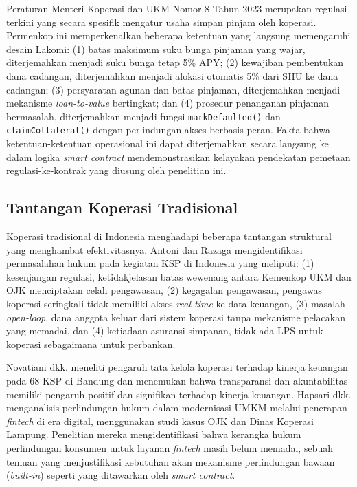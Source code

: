 Peraturan Menteri Koperasi dan UKM Nomor 8 Tahun 2023 \cite{permenkop82023} merupakan regulasi terkini yang secara spesifik mengatur usaha simpan pinjam oleh koperasi. Permenkop ini memperkenalkan beberapa ketentuan yang langsung memengaruhi desain Lakomi: (1) batas maksimum suku bunga pinjaman yang wajar, diterjemahkan menjadi suku bunga tetap 5\% APY; (2) kewajiban pembentukan dana cadangan, diterjemahkan menjadi alokasi otomatis 5\% dari SHU ke dana cadangan; (3) persyaratan agunan dan batas pinjaman, diterjemahkan menjadi mekanisme \textit{loan-to-value} bertingkat; dan (4) prosedur penanganan pinjaman bermasalah, diterjemahkan menjadi fungsi \texttt{markDefaulted()} dan \texttt{claimCollateral()} dengan perlindungan akses berbasis peran. Fakta bahwa ketentuan-ketentuan operasional ini dapat diterjemahkan secara langsung ke dalam logika \textit{smart contract} mendemonstrasikan kelayakan pendekatan pemetaan regulasi-ke-kontrak yang diusung oleh penelitian ini.

\subsection{Tantangan Koperasi Tradisional}

Koperasi tradisional di Indonesia menghadapi beberapa tantangan struktural yang menghambat efektivitasnya. Antoni dan Razaga \cite{antoni2024permasalahan} mengidentifikasi permasalahan hukum pada kegiatan KSP di Indonesia yang meliputi: (1) kesenjangan regulasi, ketidakjelasan batas wewenang antara Kemenkop UKM dan OJK menciptakan celah pengawasan, (2) kegagalan pengawasan, pengawas koperasi seringkali tidak memiliki akses \textit{real-time} ke data keuangan, (3) masalah \textit{open-loop}, dana anggota keluar dari sistem koperasi tanpa mekanisme pelacakan yang memadai, dan (4) ketiadaan asuransi simpanan, tidak ada LPS untuk koperasi sebagaimana untuk perbankan.

Novatiani dkk. \cite{novatiani2023pengaruh} meneliti pengaruh tata kelola koperasi terhadap kinerja keuangan pada 68 KSP di Bandung dan menemukan bahwa transparansi dan akuntabilitas memiliki pengaruh positif dan signifikan terhadap kinerja keuangan. Hapsari dkk. \cite{hapsari2022perlindungan} menganalisis perlindungan hukum dalam modernisasi UMKM melalui penerapan \textit{fintech} di era digital, menggunakan studi kasus OJK dan Dinas Koperasi Lampung. Penelitian mereka mengidentifikasi bahwa kerangka hukum perlindungan konsumen untuk layanan \textit{fintech} masih belum memadai, sebuah temuan yang menjustifikasi kebutuhan akan mekanisme perlindungan bawaan (\textit{built-in}) seperti yang ditawarkan oleh \textit{smart contract}.

